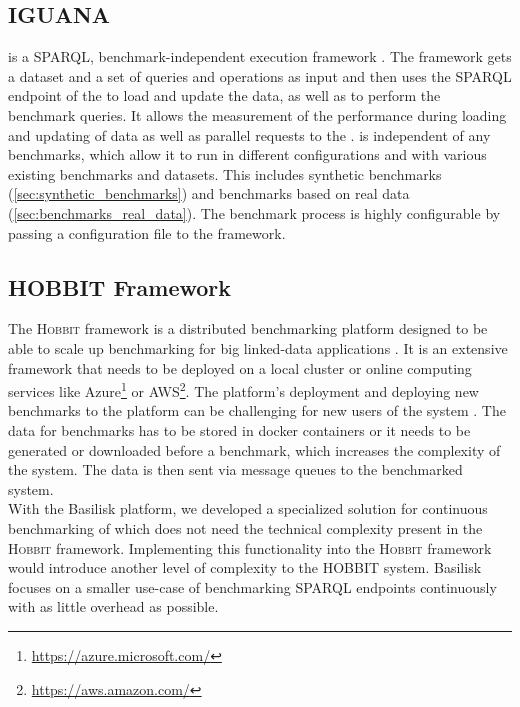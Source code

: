 \subsection{IGUANA}
\label{sec:iguana}
\iguana{} is a SPARQL, benchmark-independent execution framework \cite{conradsIguanaGenericFramework2017}.
The framework gets a dataset and a set of queries and operations as input and then uses the SPARQL endpoint of the \ts{} to load and update the data, as well as to perform the benchmark queries.
It allows the measurement of the performance during loading and updating of data as well as parallel requests to the \ts{}.
\iguana{} is independent of any benchmarks, which allow it to run in different configurations and with various existing benchmarks and datasets.
This includes synthetic benchmarks (\ref{sec:synthetic_benchmarks}) and benchmarks based on real data (\ref{sec:benchmarks_real_data}).
The benchmark process is highly configurable by passing a configuration file to the \iguana{} framework.


\subsection{HOBBIT Framework}
The \textsc{Hobbit} framework is a distributed benchmarking platform designed to be able to scale up benchmarking for big linked-data applications \cite{roderHOBBITPlatformBenchmarking}.
It is an extensive framework that needs to be deployed on a local cluster or online computing services like Azure\footnote{\url{https://azure.microsoft.com/}} or AWS\footnote{\url{https://aws.amazon.com/}}.
The platform's deployment and deploying new benchmarks to the platform can be challenging for new users of the system \cite{roderHOBBITPlatformBenchmarking}.
The data for benchmarks has to be stored in docker containers or it needs to be generated or downloaded before a benchmark, which increases the complexity of the system.
The data is then sent via message queues to the benchmarked system.
\\

With the Basilisk platform, we developed a specialized solution for continuous benchmarking of \tsp{} which does not need the technical complexity present in the \textsc{Hobbit} framework.
Implementing this functionality into the \textsc{Hobbit} framework would introduce another level of complexity to the HOBBIT system.
Basilisk focuses on a smaller use-case of benchmarking SPARQL endpoints continuously with as little overhead as possible.

